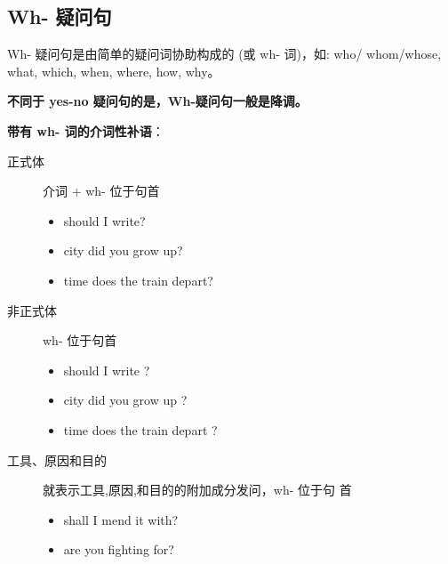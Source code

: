 \subsection{Wh- 疑问句}

Wh- 疑问句是由简单的疑问词协助构成的 (或 wh- 词)，如: who/ whom/whose,
what, which, when, where, how, why。

\textbf{不同于 yes-no 疑问句的是，Wh-疑问句一般是降调。}

\textbf{带有 wh- 词的介词性补语}：
\begin{description}
\item[正式体]介词 + wh- 位于句首
  \begin{itemize}
  \item {} should I write?
  \item {} city did you grow up?
  \item {} time does the train depart?
  \end{itemize}
\item[非正式体] wh- 位于句首
  \begin{itemize}
  \item {} should I write ?
  \item {} city did you grow up ?
  \item {} time does the train depart ?
  \end{itemize}

\item[工具、原因和目的] 就表示工具,原因,和目的的附加成分发问，wh- 位于句
  首
  \begin{itemize}
  \item {} shall I mend it with?
  \item {} are you fighting for?
  \end{itemize}
\end{description}

